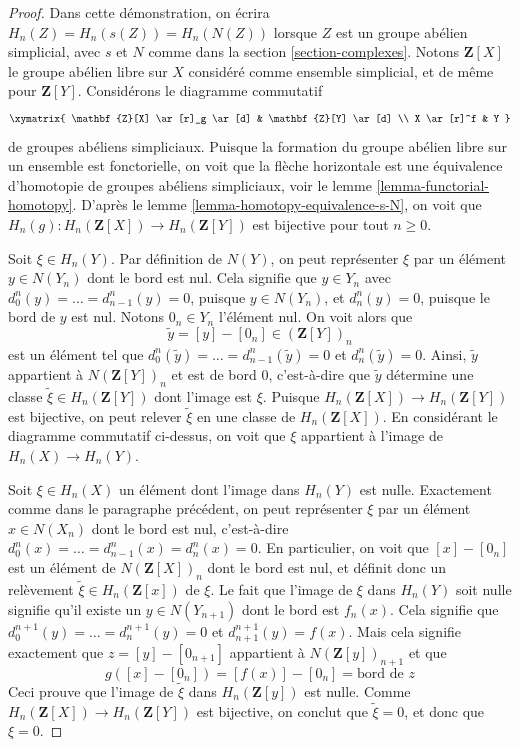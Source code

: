 \begin{proof}
Dans cette démonstration, on écrira $H_n(Z) = H_n(s(Z)) = H_n(N(Z))$
lorsque $Z$ est un groupe abélien simplicial, avec $s$ et $N$ comme dans la
section \ref{section-complexes}.
Notons $\mathbf{Z}[X]$ le groupe abélien libre sur $X$ considéré comme
ensemble simplicial, et de même pour $\mathbf{Z}[Y]$. Considérons le
diagramme commutatif
$$
\xymatrix{
\mathbf{Z}[X] \ar[r]_g \ar[d] &
\mathbf{Z}[Y] \ar[d] \\
X \ar[r]^f & Y
}
$$
de groupes abéliens simpliciaux. Puisque la formation du groupe abélien
libre sur un ensemble est fonctorielle, on voit que la flèche horizontale
est une équivalence d'homotopie de groupes abéliens simpliciaux, voir le
lemme \ref{lemma-functorial-homotopy}. D'après le lemme
\ref{lemma-homotopy-equivalence-s-N}, on voit que
$H_n(g) : H_n(\mathbf{Z}[X]) \to H_n(\mathbf{Z}[Y])$ est bijective pour tout
$n \geq 0$.

\medskip\noindent
Soit $\xi \in H_n(Y)$. Par définition de $N(Y)$, on peut représenter
$\xi$ par un élément $y \in N(Y_n)$ dont le bord est nul.
Cela signifie que $y \in Y_n$ avec
$d^n_0(y) = \ldots = d^n_{n - 1}(y) = 0$, puisque $y \in N(Y_n)$, et
$d^n_n(y) = 0$, puisque le bord de $y$ est nul. Notons $0_n \in Y_n$
l'élément nul. On voit alors que
$$
\tilde y = [y] - [0_n] \in (\mathbf{Z}[Y])_n
$$
est un élément tel que
$d^n_0(\tilde y) = \ldots = d^n_{n - 1}(\tilde y) = 0$
et $d^n_n(\tilde y) = 0$. Ainsi, $\tilde y$ appartient à
$N(\mathbf{Z}[Y])_n$ et est de bord $0$, c'est-à-dire que $\tilde y$
détermine une classe $\tilde \xi \in H_n(\mathbf{Z}[Y])$ dont l'image est
$\xi$. Puisque $H_n(\mathbf{Z}[X]) \to H_n(\mathbf{Z}[Y])$ est bijective,
on peut relever $\tilde \xi$ en une classe de $H_n(\mathbf{Z}[X])$.
En considérant le diagramme commutatif ci-dessus, on voit que $\xi$
appartient à l'image de $H_n(X) \to H_n(Y)$.

\medskip\noindent
Soit $\xi \in H_n(X)$ un élément dont l'image dans $H_n(Y)$ est nulle.
Exactement comme dans le paragraphe précédent, on peut représenter
$\xi$ par un élément $x \in N(X_n)$ dont le bord est nul, c'est-à-dire
$d^n_0(x) = \ldots = d^n_{n - 1}(x) = d^n_n(x) = 0$.
En particulier, on voit que $[x] - [0_n]$ est un élément de
$N(\mathbf{Z}[X])_n$ dont le bord est nul, et définit donc un relèvement
$\tilde \xi \in H_n(\mathbf{Z}[x])$ de $\xi$.
Le fait que l'image de $\xi$ dans $H_n(Y)$ soit nulle signifie qu'il existe
un $y \in N(Y_{n + 1})$ dont le bord est $f_n(x)$.
Cela signifie que $d^{n + 1}_0(y) = \ldots = d^{n + 1}_n(y) = 0$ et
$d^{n + 1}_{n + 1}(y) = f(x)$.
Mais cela signifie exactement que
$z = [y] - [0_{n + 1}]$ appartient à $N(\mathbf{Z}[y])_{n + 1}$ et que
$$
g([x] - [0_n]) = [f(x)] - [0_n] = \text{bord de }z
$$
Ceci prouve que l'image de $\tilde \xi$ dans $H_n(\mathbf{Z}[y])$ est nulle.
Comme $H_n(\mathbf{Z}[X]) \to H_n(\mathbf{Z}[Y])$ est bijective,
on conclut que $\tilde \xi = 0$, et donc que $\xi = 0$.
\end{proof}






